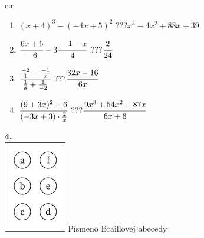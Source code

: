 \documentclass[10pt]{report}
\begin{document}
\begin{tabular}{c:c}
\begin{minipage}[c][104.5mm][t]{0.5\linewidth}
\begin{center}
\begin{minipage}{0.79\linewidth}
\begin{center}
\begin{varwidth}{\linewidth}
\begin{enumerate}
\item $(x+4)^3-(-4x+5)^2$\quad \dotfill\; ???\;\dotfill \quad $x^3-4x^2+88x+39$
\item $\cfrac{6x+5}{-6}-3\cfrac{-1-x}{4}$\quad \dotfill\; ???\;\dotfill \quad $\cfrac{2}{24}$
\item $\cfrac{\frac{-2}{1}-\frac{-1}{x}}{\frac{1}{8}+\frac{1}{-2}}$\quad \dotfill\; ???\;\dotfill \quad $\cfrac{32x-16}{6x}$
\item $\cfrac{(9+3x)^2+6}{(-3x+3)\cdot\frac{2}{x}}$\quad \dotfill\; ???\;\dotfill \quad $\cfrac{9x^3+54x^2-87x}{6x+6}$
\end{enumerate}
\end{varwidth}
\end{center}
\end{minipage}
\begin{minipage}{0.20\linewidth}
\begin{center}
{\Huge\bfseries 4.} \\[2mm]
\includegraphics[height=40mm]{../images/braille.png}
{\small Písmeno Braillovej abecedy}
\end{center}
\end{minipage}
\end{center}
\end{minipage}
%
\end{tabular}
\newpage
\thispagestyle{empty}
\end{document}

